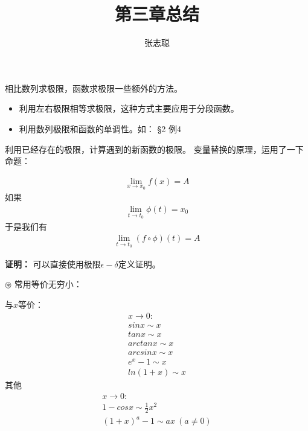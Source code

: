 \documentclass{article}
\begin{document}
\title{第三章总结}
\author{张志聪}
\maketitle

\begin{zremark}
  相比数列求极限，函数求极限一些额外的方法。
\end{zremark}

\begin{itemize}
  \item 利用左右极限相等求极限，这种方式主要应用于分段函数。
  \item 利用数列极限和函数的单调性。如： \S2 例4
\end{itemize}

\begin{zremark}
  利用已经存在的极限，计算遇到的新函数的极限。
  变量替换的原理，运用了一下命题：

  \begin{align*}
    \lim\limits_{x \to x_0} f(x) = A
  \end{align*}
  如果
  \begin{align*}
    \lim\limits_{t \to t_0} \phi(t) = x_0
  \end{align*}
  于是我们有
  \begin{align*}
    \lim\limits_{t \to t_0} (f \circ \phi)(t) = A
  \end{align*}
\end{zremark}

\textbf{证明：}
可以直接使用极限$\epsilon - \delta$定义证明。

\begin{zremark}
  $\circledast$
  常用等价无穷小：

  与$x$等价：
  \begin{align*}
    x \to 0 :       \\
    sin x \sim x    \\
    tan x \sim x    \\
    arctan x \sim x \\
    arcsin x \sim x \\
    e^x - 1 \sim x  \\
    ln(1 + x) \sim x
  \end{align*}
  其他
  \begin{align*}
    x \to 0 :                    \\
    1 - cosx \sim \frac{1}{2}x^2 \\
    (1 + x)^a - 1 \sim a x \ (a \neq 0)
  \end{align*}
\end{zremark}
\end{document}

